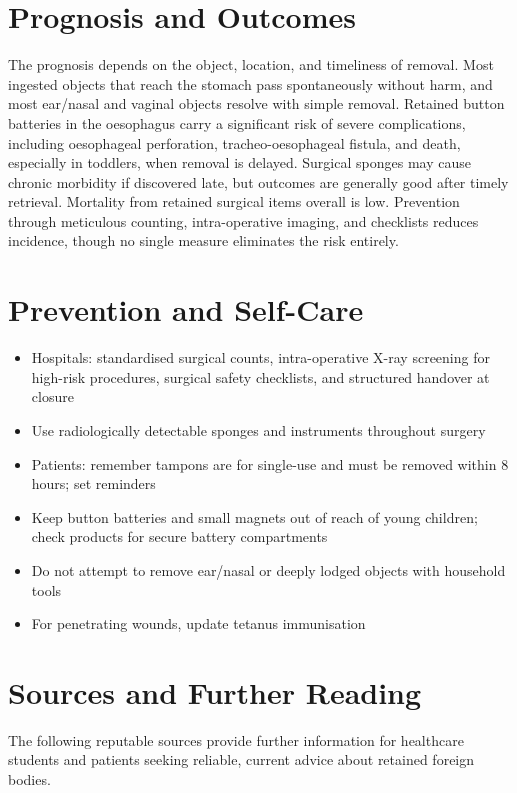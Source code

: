 \section*{Prognosis and Outcomes}
The prognosis depends on the object, location, and timeliness of removal. Most ingested objects that reach the stomach pass spontaneously without harm, and most ear/nasal and vaginal objects resolve with simple removal. Retained button batteries in the oesophagus carry a significant risk of severe complications, including oesophageal perforation, tracheo-oesophageal fistula, and death, especially in toddlers, when removal is delayed. Surgical sponges may cause chronic morbidity if discovered late, but outcomes are generally good after timely retrieval. Mortality from retained surgical items overall is low. Prevention through meticulous counting, intra-operative imaging, and checklists reduces incidence, though no single measure eliminates the risk entirely.

\section*{Prevention and Self-Care}
\begin{itemize}
    \item Hospitals: standardised surgical counts, intra-operative X-ray screening for high-risk procedures, surgical safety checklists, and structured handover at closure
    \item Use radiologically detectable sponges and instruments throughout surgery
    \item Patients: remember tampons are for single-use and must be removed within 8 hours; set reminders
    \item Keep button batteries and small magnets out of reach of young children; check products for secure battery compartments
    \item Do not attempt to remove ear/nasal or deeply lodged objects with household tools
    \item For penetrating wounds, update tetanus immunisation
\end{itemize}

\section*{Sources and Further Reading}
The following reputable sources provide further information for healthcare students and patients seeking reliable, current advice about retained foreign bodies.

